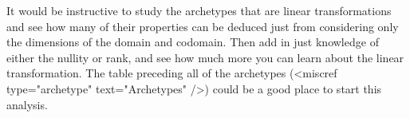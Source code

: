 \documentclass{ximera}
\begin{document}
It would be instructive to study the archetypes that are linear transformations and see how many of their properties can be deduced just from considering only the dimensions of the domain and codomain.  Then add in just knowledge of either the nullity or rank, and see how much more you can learn about the linear transformation.  The table preceding all of the archetypes (<miscref type="archetype" text="Archetypes" />) could be a good place to start this analysis.
\end{document}
